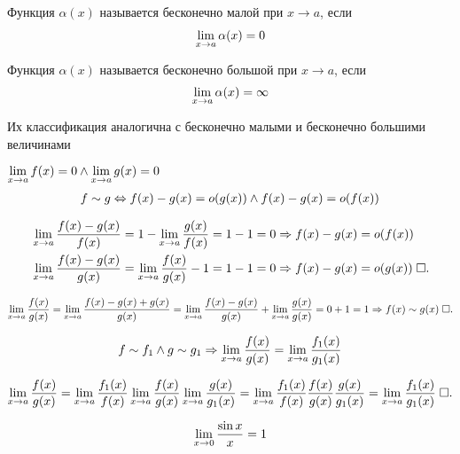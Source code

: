\documentclass{article}
\begin{document}


Функция $\alpha(x)$ называется бесконечно малой при $x\to a$, если
\begin{align*}
	\lim\limits_{x\to a} \alpha(x)=0
\end{align*}

Функция $\alpha(x)$ называется бесконечно большой при $x\to a$, если
\begin{align*}
	\lim\limits_{x\to a} \alpha(x)=\infty
\end{align*}

Их классификация аналогична с бесконечно малыми и бесконечно большими величинами

\theorem

$\lim\limits_{x\to a}f(x)=0\land\lim\limits_{x\to a}g(x)=0$
\begin{align*}
	f\sim g\Leftrightarrow f(x)-g(x)=o(g(x))\land f(x)-g(x)=o(f(x))
\end{align*}

\onlyif
\begin{align*}
	 & \lim\limits_{x\to a}\frac{f(x)-g(x)}{f(x)}=1-\lim\limits_{x\to a}\frac{g(x)}{f(x)}=1-1=0\Rightarrow f(x)-g(x)=o(f(x))     \\
	 & \lim\limits_{x\to a}\frac{f(x)-g(x)}{g(x)}=\lim\limits_{x\to a}\frac{f(x)}{g(x)}-1=1-1=0\Rightarrow f(x)-g(x)=o(g(x))\;\square.
\end{align*}

\enough
\begin{align*}
	\lim\limits_{x\to a}\frac{f(x)}{g(x)}=\lim\limits_{x\to a}\frac{f(x)-g(x)+g(x)}{g(x)}=\lim\limits_{x\to a}\frac{f(x)-g(x)}{g(x)}+\lim\limits_{x\to a}\frac{g(x)}{g(x)}=0+1=1\Rightarrow f(x)\sim g(x)\;\square.
\end{align*}

\theorem
\begin{align*}
	f\sim f_1\land g\sim g_1\Rightarrow \lim\limits_{x\to a}\frac{f(x)}{g(x)}=\lim\limits_{x\to a}\frac{f_1(x)}{g_1(x)}
\end{align*}

\proof
\begin{align*}
	\lim\limits_{x\to a}\frac{f(x)}{g(x)}=\lim\limits_{x\to a}\frac{f_1(x)}{f(x)}\lim\limits_{x\to a}\frac{f(x)}{g(x)}\lim\limits_{x\to a}\frac{g(x)}{g_1(x)}=
	\lim\limits_{x\to a}\frac{f_1(x)}{f(x)}\frac{f(x)}{g(x)}\frac{g(x)}{g_1(x)}=\lim\limits_{x\to a}\frac{f_1(x)}{g_1(x)}\;\square.
\end{align*}

\pagebreak

\theorem
\begin{align*}
	\lim\limits_{x \to 0} \frac{\sin x}x =1
\end{align*}
\end{document}
